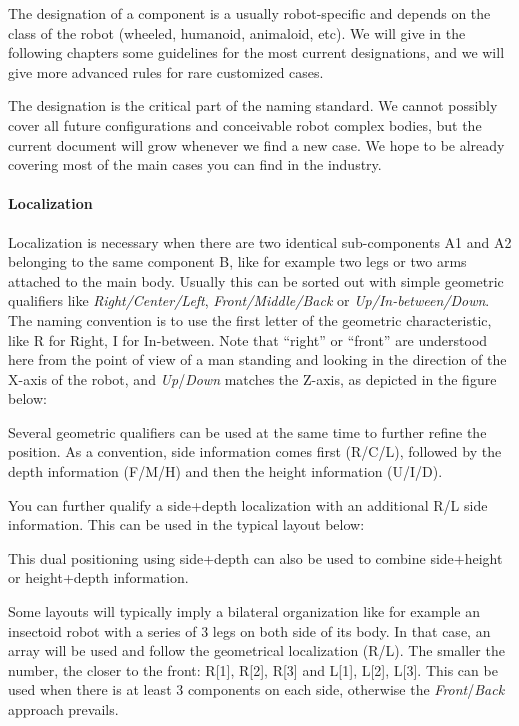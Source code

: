 The designation of a component is a usually robot-specific and depends
on the class of the robot (wheeled, humanoid, animaloid, etc). We will
give in the following chapters some guidelines for the most current
designations, and we will give more advanced rules for rare customized
cases.


The designation is the critical part of the naming standard. We cannot
possibly cover all future configurations and conceivable robot complex
bodies, but the current document will grow whenever we find a new case.
We hope to be already covering most of the main cases you can find in
the industry.

\paragraph{Localization }

Localization is necessary when there are two identical
sub-components A1 and A2 belonging to the same component B, like for
example two legs or two arms attached to the main body. Usually this
can be sorted out with simple geometric qualifiers like
\textit{Right/Center/Left},
\textit{Front/Middle/Back} or
\textit{Up}\textit{/In-between/Down}. The
naming convention is to use the first letter of the geometric
characteristic, like R for Right, I for In-between.
Note that “right” or “front” are understood here from the point of view
of a man standing and looking in the direction of the X-axis of the
robot, and
\textit{Up}/\textit{Down} matches
the Z-axis, as depicted in the figure below:

{\par}

Several geometric qualifiers can be used at the same time to
further refine the position. As a convention, side information comes
first (R/C/L), followed by the depth
information (F/M/H) and then the height
information (U/I/D).


You can further qualify a side+depth localization with an additional R/L
side information. This can be used in the typical layout below:

{\centering
\par}


This dual positioning using side+depth can also be used to combine
side+height or height+depth information.


Some layouts will typically imply a bilateral organization like for
example an insectoid robot with a series of 3 legs on both side of its
body. In that case, an array will be used and follow the geometrical
localization (R/L). The smaller the number, the closer to the front:
R[1], R[2], R[3] and L[1], L[2], L[3]. This can be used when there is
at least 3 components on each side, otherwise the
\textit{Front}/\textit{Back} approach prevails.


